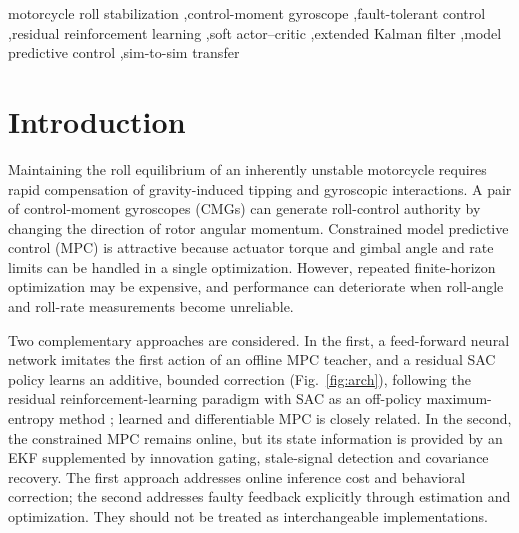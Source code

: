 \documentclass[preprint,12pt,authoryear=false]{elsarticle}
\theoremstyle{remark}\newtheorem{remark}{Remark}
\theoremstyle{plain}\newtheorem{proposition}{Proposition}\newtheorem{lemma}{Lemma}
\theoremstyle{definition}\newtheorem{assumption}{Assumption}
\begin{document}
\begin{frontmatter}
\begin{keyword}
motorcycle roll stabilization \sep control-moment gyroscope \sep fault-tolerant control \sep residual reinforcement learning \sep soft actor--critic \sep extended Kalman filter \sep model predictive control \sep sim-to-sim transfer
\end{keyword}
\end{frontmatter}

\linenumbers

\section{Introduction}
Maintaining the roll equilibrium of an inherently unstable motorcycle requires rapid compensation of gravity-induced tipping and gyroscopic interactions. A pair of control-moment gyroscopes (CMGs) can generate roll-control authority by changing the direction of rotor angular momentum. Constrained model predictive control (MPC) is attractive because actuator torque and gimbal angle and rate limits can be handled in a single optimization. However, repeated finite-horizon optimization may be expensive, and performance can deteriorate when roll-angle and roll-rate measurements become unreliable.

Two complementary approaches are considered. In the first, a feed-forward neural network imitates the first action of an offline MPC teacher, and a residual SAC policy learns an additive, bounded correction (Fig.~\ref{fig:arch}), following the residual reinforcement-learning paradigm \cite{johannink2019residual} with SAC as an off-policy maximum-entropy method \cite{haarnoja2018soft,haarnoja2018softapps}; learned and differentiable MPC \cite{amos2018differentiable} is closely related. In the second, the constrained MPC remains online, but its state information is provided by an EKF \cite{kalman1960new} supplemented by innovation gating, stale-signal detection and covariance recovery. The first approach addresses online inference cost and behavioral correction; the second addresses faulty feedback explicitly through estimation and optimization. They should not be treated as interchangeable implementations.
\end{document}
